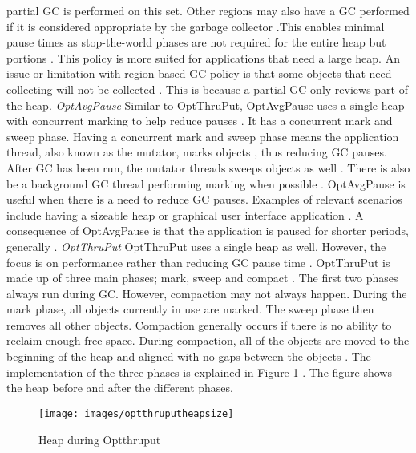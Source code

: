 partial GC is performed on this set. Other regions may also have a GC performed
if it is considered appropriate by the garbage collector \cite{ibmwhenbalanced}.This enables minimal pause times as stop-the-world phases are not required for the entire heap but portions \cite{ibmBalanced}. This policy is more suited for applications that need a large heap. An issue or
limitation with region-based GC policy is that some objects that need collecting will not be collected \cite{ibmwhenbalanced}. This is because a partial GC only reviews
part of the heap.
\newline\newline
\emph{OptAvgPause}
\newline\newline
Similar to OptThruPut, OptAvgPause uses a single heap with concurrent marking to help
reduce pauses \cite{nartovich2007ibm}. It has a concurrent mark and sweep
phase. Having a concurrent mark and sweep phase means the application
thread, also known as the mutator, marks objects \cite{persson2006gc2}, thus reducing GC pauses. After GC has been run, the mutator threads sweeps objects as well \cite{nartovich2007ibm}. There is also be a background GC thread performing marking when
possible \cite{persson2006gc1}. OptAvgPause is useful when there is a need to reduce GC pauses.
\newline\newline
Examples of relevant scenarios include having a sizeable heap or
graphical user interface application \cite{persson2006gc1}. A consequence of
OptAvgPause is that the application is paused for shorter periods, generally
\cite{persson2006gc2}.
\newline\newline
\emph{OptThruPut}
\newline\newline
OptThruPut uses a single heap as well. However, the focus is on
performance rather than reducing GC pause time \cite{nartovich2007ibm}. OptThruPut is made up of three main phases; mark, sweep and compact \cite{nartovich2007ibm}. The first two phases always run during GC. However, compaction may not always happen. During the mark phase, all objects currently in use are marked. The sweep phase then removes all other objects. Compaction generally occurs if there is no ability to reclaim enough free space. During compaction, all of the objects are moved to the beginning of the heap and aligned with no gaps between the objects \cite{persson2006gc1}. The implementation of the three phases is explained in Figure \ref{fig:heap_optthruput} \cite{persson2006gc2}. The figure shows the heap before and after the different phases.
\begin{figure}
    \centering
    \texttt{[image: images/optthruputheapsize]}
    \caption{Heap during Optthruput}
    \label{fig:heap_optthruput}
\end{figure}
